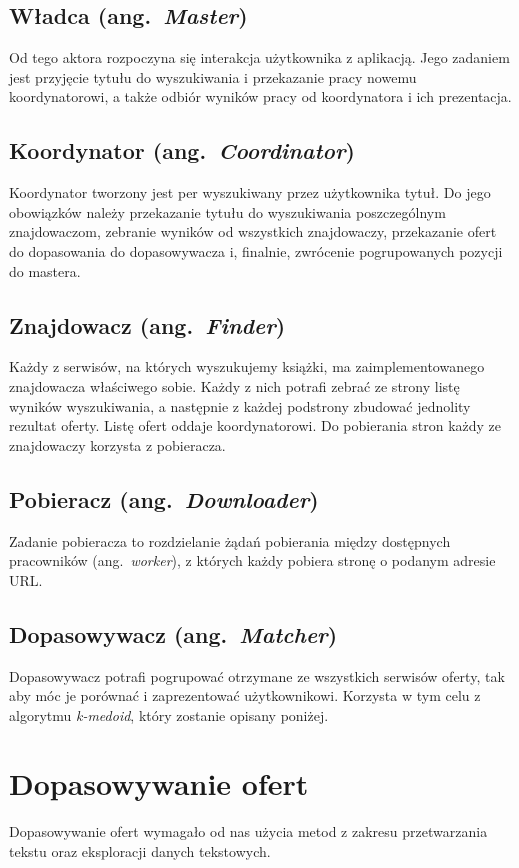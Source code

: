 \documentclass[a4paper,12pt]{mwart}
\newcommand{\ang}[1]{ang.~{\itshape #1}}
\begin{document}
\subsection{Władca (\ang{Master})}
Od tego aktora rozpoczyna się interakcja użytkownika z aplikacją. Jego zadaniem jest przyjęcie tytułu do wyszukiwania i przekazanie pracy nowemu koordynatorowi,
a także odbiór wyników pracy od koordynatora i ich prezentacja.

\subsection{Koordynator (\ang{Coordinator})}
Koordynator tworzony jest per wyszukiwany przez użytkownika tytuł. Do jego obowiązków należy przekazanie tytułu do wyszukiwania poszczególnym znajdowaczom,
zebranie wyników od wszystkich znajdowaczy, przekazanie ofert do dopasowania do dopasowywacza i, finalnie, zwrócenie pogrupowanych pozycji do mastera.

\subsection{Znajdowacz (\ang{Finder})}
Każdy z serwisów, na których wyszukujemy książki, ma zaimplementowanego znajdowacza właściwego sobie. Każdy z nich potrafi zebrać ze strony listę wyników wyszukiwania,
a następnie z każdej podstrony zbudować jednolity rezultat oferty. Listę ofert oddaje koordynatorowi. Do pobierania stron każdy ze znajdowaczy korzysta z pobieracza.

\subsection{Pobieracz (\ang{Downloader})}
Zadanie pobieracza to rozdzielanie żądań pobierania między dostępnych pracowników (\ang{worker}), z których każdy pobiera stronę o podanym adresie URL.

\subsection{Dopasowywacz (\ang{Matcher})}
Dopasowywacz potrafi pogrupować otrzymane ze wszystkich serwisów oferty, tak aby móc je porównać i zaprezentować użytkownikowi.
Korzysta w tym celu z algorytmu {\itshape k-medoid}, który zostanie opisany poniżej.

\section{Dopasowywanie ofert}
Dopasowywanie ofert wymagało od nas użycia metod z zakresu przetwarzania tekstu oraz eksploracji danych tekstowych.
\end{document}
